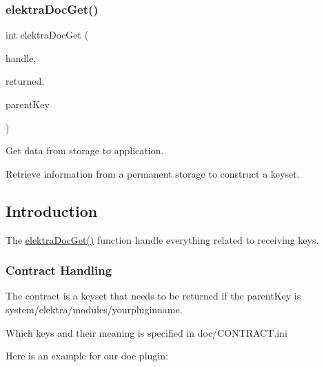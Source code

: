 \subsubsection{\texorpdfstring{elektraDocGet()}{elektraDocGet()}}
{\footnotesize\ttfamily int elektra\+Doc\+Get (\begin{DoxyParamCaption}\item[{Plugin $\ast$}]{handle,  }\item[{Key\+Set $\ast$}]{returned,  }\item[{Key $\ast$}]{parent\+Key }\end{DoxyParamCaption})}



Get data from storage to application. 

Retrieve information from a permanent storage to construct a keyset.\hypertarget{group__plugin_intro}{}\subsection{Introduction}\label{group__plugin_intro}
The \mbox{\hyperlink{group__plugin_gacb69f3441c6d84241b4362f958fbe313}{elektra\+Doc\+Get()}} function handle everything related to receiving keys.\hypertarget{group__plugin_contract}{}\subsubsection{Contract Handling}\label{group__plugin_contract}
The contract is a keyset that needs to be returned if the parent\+Key is system/elektra/modules/yourpluginname.

Which keys and their meaning is specified in doc/\+C\+O\+N\+T\+R\+A\+C\+T.\+ini

Here is an example for our doc plugin\+:


